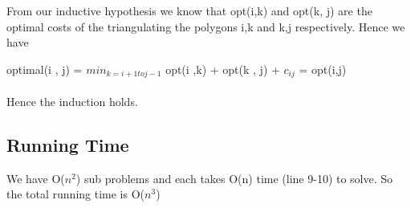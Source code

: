 \documentclass[12pt]{article}
\begin{document}
From our inductive hypothesis we know that opt(i,k) and opt(k, j) are the optimal costs of the triangulating the polygons i,k and k,j respectively. 
Hence we have 

optimal(i , j) =  $min_{k = i+1 to j-1}$ { opt(i ,k) + opt(k , j) + $c_{ij}$} = opt(i,j)
\\\\
Hence the induction holds.


\subsection{Running Time}

We have O($n^2$) sub problems and each takes O(n) time (line 9-10) to solve. So the total running time is O($n^3$)
\end{document}

